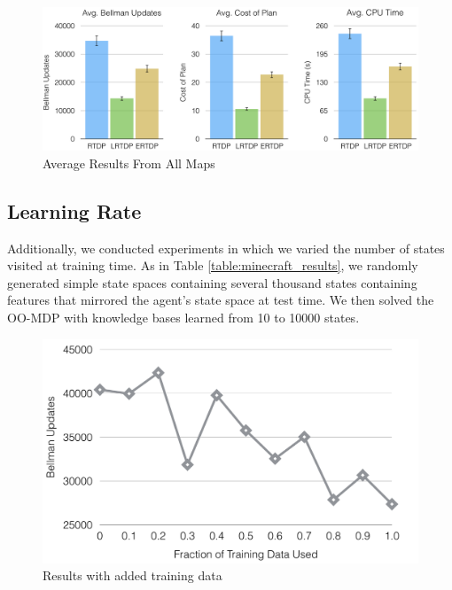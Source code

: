 \documentclass[letterpaper]{article}
\newcommand{\dnote}[1]{\textcolor{Green}{\textbf{}}}
\begin{document}
\begin{figure}[t]
\centering
\includegraphics[scale=0.24]{figures/average_results.png}%
  \caption{Average Results From All Maps}
  \label{fig:average_results}
\end{figure}

\subsection{Learning Rate}
Additionally, we conducted experiments in which we varied the number of states visited at training time. 
As in Table \ref{table:minecraft_results}, we randomly generated simple state spaces
containing several thousand states containing features that mirrored the agent's state
space at test time. We then solved the OO-MDP with knowledge bases learned from 
10 to 10000 states.\dnote{update when training complete}

\dnote{Experiments have not yet finished for learning rate (underway)}

\begin{figure}[H]
\centering
\includegraphics[scale=0.23]{figures/training_results.png}%
  \caption{Results with added training data}
  \label{fig:training_results}
\end{figure}
\end{document}
